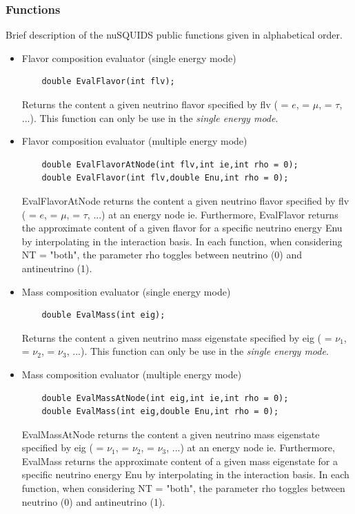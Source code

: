 \documentclass[3p,12pt,authoryear]{elsarticle}
\newcommand{\ttf}{\ttfamily}
\begin{document}
\subsubsection{Functions}

Brief description of the {\ttfamily nuSQUIDS} public functions given in alphabetical order.

\begin{itemize}
\item Flavor composition evaluator (single energy mode)
  \begin{lstlisting}
    double EvalFlavor(int flv);
  \end{lstlisting}
Returns the content a given neutrino flavor specified by {\ttfamily flv} ({ = $e$}, { = $\mu$}, { = $\tau$}, ...). This function can only be use in the {\it single energy mode}.
\item Flavor composition evaluator (multiple energy mode)
  \begin{lstlisting}
    double EvalFlavorAtNode(int flv,int ie,int rho = 0);
    double EvalFlavor(int flv,double Enu,int rho = 0);
  \end{lstlisting}
{\ttfamily EvalFlavorAtNode} returns the content a given neutrino flavor specified by {\ttfamily flv} ({ = $e$}, { = $\mu$}, { = $\tau$, ...}) at an energy node {\ttfamily ie}. Furthermore, {\ttfamily EvalFlavor} returns the approximate content of a given flavor for a specific neutrino energy  {\ttf Enu} by interpolating in the interaction basis. In each function, when considering  {\ttf  NT = "both"}, the parameter {\ttf rho} toggles between {\ttf neutrino (0)} and {\ttf antineutrino (1)}.
\item Mass composition evaluator (single energy mode)
  \begin{lstlisting}
    double EvalMass(int eig);
  \end{lstlisting}
Returns the content a given neutrino mass eigenstate specified by {\ttfamily eig} ({ = $\nu_1$}, { = $\nu_2$}, { = $\nu_3$, ...}). This function can only be use in the {\it single energy mode}.
\item Mass composition evaluator (multiple energy mode)
  \begin{lstlisting}
    double EvalMassAtNode(int eig,int ie,int rho = 0);
    double EvalMass(int eig,double Enu,int rho = 0);
  \end{lstlisting}
{\ttfamily EvalMassAtNode} returns the content a given neutrino mass eigenstate specified by {\ttfamily eig} ({ = $\nu_1$}, { = $\nu_2$}, { = $\nu_3$, ...}) at an energy node {\ttfamily ie}. Furthermore, {\ttfamily EvalMass} returns the approximate content of a given mass eigenstate for a specific neutrino energy  {\ttf Enu} by interpolating in the interaction basis. In each function, when considering  {\ttf  NT = "both"}, the parameter {\ttf rho} toggles between {\ttf neutrino (0)} and {\ttf antineutrino (1)}.

\end{itemize}
\end{document}

